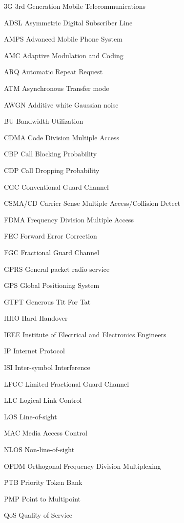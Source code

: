 \begin{denotation}
\item[3G] 3rd Generation Mobile Telecommunications
\item[ADSL] Asymmetric Digital Subscriber Line
\item[AMPS] Advanced Mobile Phone System
\item[AMC] Adaptive Modulation and Coding
\item[ARQ] Automatic Repeat Request
\item[ATM]Asynchronous Transfer mode
\item[AWGN]  Additive white Gaussian noise
\item[BU] Bandwidth Utilization
\item[CDMA] Code Division Multiple Access 
\item[CBP] Call Blocking Probability
\item[CDP] Call Dropping Probability
\item[CGC] Conventional Guard Channel
\item[CSMA/CD] Carrier Sense Multiple Access/Collision Detect
\item[FDMA]Frequency Division Multiple Access
\item[FEC] Forward Error Correction
\item[FGC] Fractional Guard Channel
  \item[GPRS] General packet radio service
  \item[GPS] Global Positioning System
  \item[GTFT] Generous Tit For Tat
  \item[HHO] Hard Handover
  \item[IEEE] Institute of Electrical and Electronics Engineers
  \item[IP] Internet Protocol
  \item[ISI] Inter-symbol Interference
  \item[LFGC] Limited Fractional Guard Channel
  \item[LLC] Logical Link Control
  \item[LOS] Line-of-sight
  \item[MAC] Media Access Control
  \item[NLOS] Non-line-of-sight
  \item[OFDM] Orthogonal Frequency Division Multiplexing 
  \item[PTB] Priority Token Bank
  \item[PMP] Point to Multipoint
  \item[QoS] Quality of Service

\end{denotation}
